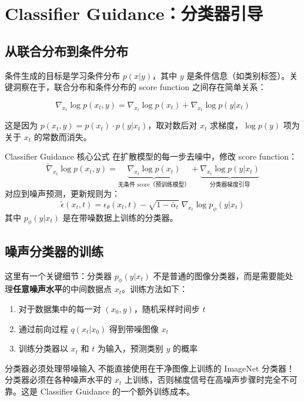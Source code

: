 \section{Classifier Guidance：分类器引导}

\subsection{从联合分布到条件分布}

条件生成的目标是学习条件分布 $p(x|y)$，其中 $y$ 是条件信息（如类别标签）。关键洞察在于，联合分布和条件分布的 score function 之间存在简单关系：

$$
\nabla_{x_t}\log p(x_t, y) = \nabla_{x_t}\log p(x_t) + \nabla_{x_t}\log p(y|x_t)
$$

这是因为 $p(x_t, y) = p(x_t)\cdot p(y|x_t)$，取对数后对 $x_t$ 求梯度，$\log p(y)$ 项为关于 $x_t$ 的常数而消失。

\begin{importantbox}{Classifier Guidance 核心公式}
在扩散模型的每一步去噪中，修改 score function：
$$
\tilde{\nabla}_{x_t}\log p(x_t, y) = \underbrace{\nabla_{x_t}\log p(x_t)}_{\text{无条件 score（预训练模型）}} + \underbrace{\nabla_{x_t}\log p(y|x_t)}_{\text{分类器梯度引导}}
$$
对应到噪声预测，更新规则为：
$$
\tilde{\epsilon}(x_t, t) = \epsilon_\theta(x_t, t) - \sqrt{1-\bar\alpha_t}\;\nabla_{x_t}\log p_\phi(y|x_t)
$$
其中 $p_\phi(y|x_t)$ 是在带噪数据上训练的分类器。
\end{importantbox}

\subsection{噪声分类器的训练}

这里有一个关键细节：分类器 $p_\phi(y|x_t)$ 不是普通的图像分类器，而是需要能处理\textbf{任意噪声水平}的中间数据点 $x_t$。训练方法如下：

\begin{enumerate}
    \item 对于数据集中的每一对 $(x_0, y)$，随机采样时间步 $t$
    \item 通过前向过程 $q(x_t|x_0)$ 得到带噪图像 $x_t$
    \item 训练分类器以 $x_t$ 和 $t$ 为输入，预测类别 $y$ 的概率
\end{enumerate}

\begin{warningbox}{分类器必须处理带噪输入}
不能直接使用在干净图像上训练的 ImageNet 分类器！分类器必须在各种噪声水平的 $x_t$ 上训练，否则梯度信号在高噪声步骤时完全不可靠。这是 Classifier Guidance 的一个额外训练成本。
\end{warningbox}

